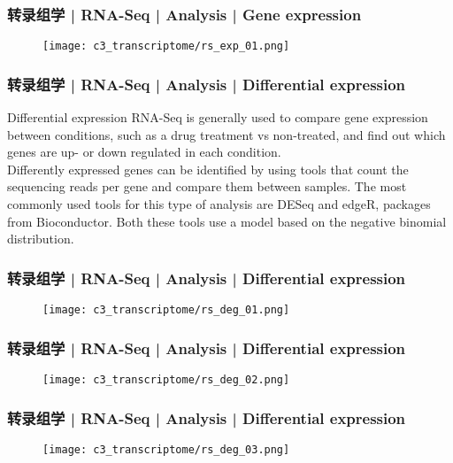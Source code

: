 \begin{frame}
  \frametitle{转录组学 | RNA-Seq | Analysis | Gene expression}
  \begin{figure}
    \centering
    \texttt{[image: c3\_transcriptome/rs\_exp\_01.png]}
  \end{figure}
\end{frame}

\begin{frame}
  \frametitle{转录组学 | RNA-Seq | Analysis | Differential expression}
  \begin{block}{Differential expression}
 RNA-Seq is generally used to compare gene expression between conditions, such as a drug treatment vs non-treated, and find out which genes are up- or down regulated in each condition.\\
 \vspace{0.5em}
 Differently expressed genes can be identified by using tools that count the sequencing reads per gene and compare them between samples. The most commonly used tools for this type of analysis are DESeq and edgeR, packages from Bioconductor. Both these tools use a model based on the negative binomial distribution.
  \end{block}
\end{frame}

\begin{frame}
  \frametitle{转录组学 | RNA-Seq | Analysis | Differential expression}
  \begin{figure}
    \centering
    \texttt{[image: c3\_transcriptome/rs\_deg\_01.png]}
  \end{figure}
\end{frame}

\begin{frame}
  \frametitle{转录组学 | RNA-Seq | Analysis | Differential expression}
  \begin{figure}
    \centering
    \texttt{[image: c3\_transcriptome/rs\_deg\_02.png]}
  \end{figure}
\end{frame}

\begin{frame}
  \frametitle{转录组学 | RNA-Seq | Analysis | Differential expression}
  \begin{figure}
    \centering
    \texttt{[image: c3\_transcriptome/rs\_deg\_03.png]}
  \end{figure}
\end{frame}

